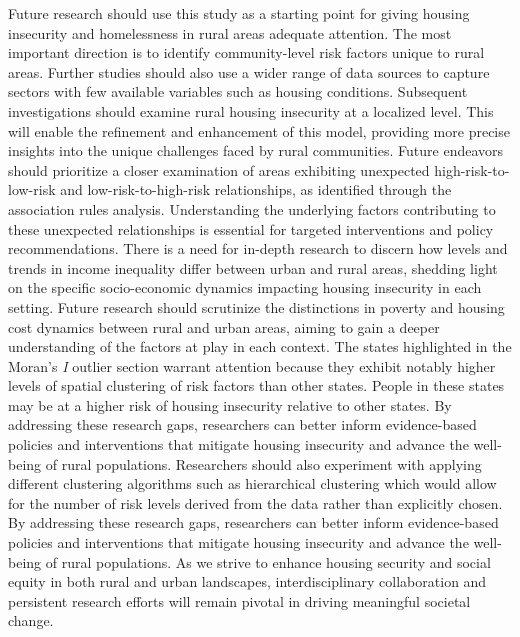 Future research should use this study as a starting point for giving housing insecurity and homelessness in rural areas adequate attention. The most important direction is to identify community-level risk factors unique to rural areas. Further studies should also use a wider range of data sources to capture sectors with few available variables such as housing conditions. Subsequent investigations should examine rural housing insecurity at a localized level. This will enable the refinement and enhancement of this model, providing more precise insights into the unique challenges faced by rural communities.	Future endeavors should prioritize a closer examination of areas exhibiting unexpected high-risk-to-low-risk and low-risk-to-high-risk relationships, as identified through the association rules analysis. Understanding the underlying factors contributing to these unexpected relationships is essential for targeted interventions and policy recommendations. There is a need for in-depth research to discern how levels and trends in income inequality differ between urban and rural areas, shedding light on the specific socio-economic dynamics impacting housing insecurity in each setting. Future research should scrutinize the distinctions in poverty and housing cost dynamics between rural and urban areas, aiming to gain a deeper understanding of the factors at play in each context. The states highlighted in the Moran's \textit{I} outlier section warrant attention because they exhibit notably higher levels of spatial clustering of risk factors than other states. People in these states may be at a higher risk of housing insecurity relative to other states. By addressing these research gaps, researchers can better inform evidence-based policies and interventions that mitigate housing insecurity and advance the well-being of rural populations. Researchers should also experiment with applying different clustering algorithms such as hierarchical clustering which would allow for the number of risk levels derived from the data rather than explicitly chosen. By addressing these research gaps, researchers can better inform evidence-based policies and interventions that mitigate housing insecurity and advance the well-being of rural populations. As we strive to enhance housing security and social equity in both rural and urban landscapes, interdisciplinary collaboration and persistent research efforts will remain pivotal in driving meaningful societal change. 

\endinput